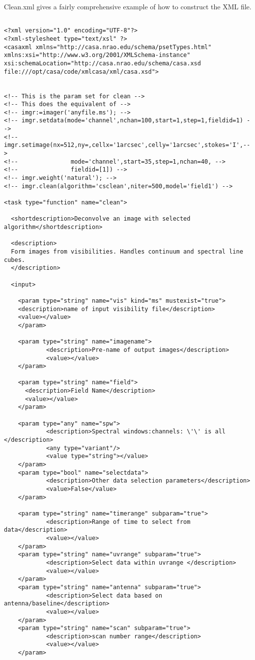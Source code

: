 Clean.xml gives a fairly comprehensive example of how to construct the
XML file.
\begin{verbatim}

<?xml version="1.0" encoding="UTF-8"?>
<?xml-stylesheet type="text/xsl" ?>
<casaxml xmlns="http://casa.nrao.edu/schema/psetTypes.html"
xmlns:xsi="http://www.w3.org/2001/XMLSchema-instance"
xsi:schemaLocation="http://casa.nrao.edu/schema/casa.xsd
file:///opt/casa/code/xmlcasa/xml/casa.xsd">


<!-- This is the param set for clean -->
<!-- This does the equivalent of -->
<!-- imgr:=imager('anyfile.ms'); -->
<!-- imgr.setdata(mode='channel',nchan=100,start=1,step=1,fieldid=1) -->
<!-- imgr.setimage(nx=512,ny=,cellx='1arcsec',celly='1arcsec',stokes='I',-->
<!--               mode='channel',start=35,step=1,nchan=40, -->
<!--               fieldid=[1]) -->
<!-- imgr.weight('natural'); -->
<!-- imgr.clean(algorithm='csclean',niter=500,model='field1') -->

<task type="function" name="clean">

  <shortdescription>Deconvolve an image with selected algorithm</shortdescription>

  <description>
  Form images from visibilities. Handles continuum and spectral line cubes.
  </description>

  <input>

    <param type="string" name="vis" kind="ms" mustexist="true">
    <description>name of input visibility file</description>
    <value></value>
    </param>

    <param type="string" name="imagename">
            <description>Pre-name of output images</description>
            <value></value>
    </param>

    <param type="string" name="field">
      <description>Field Name</description>
      <value></value>
    </param>

    <param type="any" name="spw">
            <description>Spectral windows:channels: \'\' is all </description>
            <any type="variant"/>
            <value type="string"></value>
    </param>
    <param type="bool" name="selectdata">
            <description>Other data selection parameters</description>
            <value>False</value>
    </param>
    
    <param type="string" name="timerange" subparam="true">
            <description>Range of time to select from data</description>
            <value></value>
    </param>
    <param type="string" name="uvrange" subparam="true">
            <description>Select data within uvrange </description>
            <value></value>
    </param>
    <param type="string" name="antenna" subparam="true">
            <description>Select data based on antenna/baseline</description>
            <value></value>
    </param>
    <param type="string" name="scan" subparam="true">
            <description>scan number range</description>
            <value></value>
    </param>
    


\end{verbatim}
